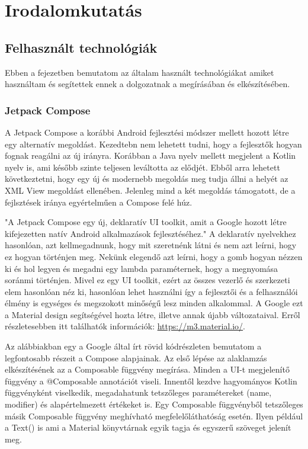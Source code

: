 \chapter{Irodalomkutatás}
\label{sec:Search}

\section{Felhasznált technológiák}
\label{sec:Technologies}

Ebben a fejezetben bemutatom az általam használt technológiákat amiket használtam és segítettek ennek a dolgozatnak a megírásában és elkészítésében.

\subsection{Jetpack Compose}

A Jetpack Compose a korábbi Android fejlesztési módszer mellett hozott létre egy alternatív megoldást.
Kezedtebn nem lehetett tudni, hogy a fejlesztők hogyan fognak reagálni az új irányra.
Korábban a Java nyelv mellett megjelent a Kotlin nyelv is, ami később szinte teljesen leváltotta az elődjét.
Ebből arra lehetett következtetni, hogy egy új és modernebb megoldás meg tudja állni a helyét az XML View megoldást ellenében.
Jelenleg mind a két megoldás támogatott, de a fejlsztések iránya egyértelműen a Compose felé húz.

"A Jetpack Compose egy új, deklaratív UI toolkit, amit a Google hozott létre kifejezetten natív Android alkalmazások fejlesztéséhez."\cite{GettingStartedWithJetpackCompose}
A deklaratív nyelvekhez hasonlóan, azt kellmegadnunk, hogy mit szeretnénk látni és nem azt leírni, hogy ez hogyan történjen meg.
Nekünk elegendő azt leírni, hogy a gomb hogyan nézzen ki és hol legyen és megadni egy lambda paraméternek, hogy a megnyomása soránmi történjen.
Mivel ez egy UI toolkit, ezért az összes vezerlő és szerkezeti elem hasonlóan néz ki, hasonlóan lehet használni így a fejlesztői és a felhasználói élmény is egységes és megszokott minőségű lesz minden alkalommal.
A Google ezt a Material design segítségével hozta létre, illetve annak újabb változataival. Erről részletesebben itt találhatók információk: \url{https://m3.material.io/}.

Az alábbiakban egy a Google által írt rövid kódrészleten bemutatom a legfontosabb részeit a Compose alapjainak.\cite{BasicCodelab}
Az első lépése az alaklamzás elkészítésének az a Composable függvény megírása.
Minden a UI-t megjelenítő függvény a @Composable annotációt viseli.
Innentől kezdve hagyományos Kotlin függvényként viselkedik, megadahatunk tetszőleges paramétereket (name, modifier) és alapértelmezett értékeket is.
Egy Composable függvényből tetszőleges másik Composable függvény meghívható megfelelőláthatóság esetén.
Ilyen például a Text() is ami a Material könyvtárnak egyik tagja és egyszerű szöveget jelenít meg.

